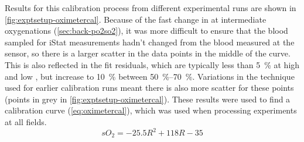 Results for this calibration process from different experimental runs are shown in \autoref{fig:exptsetup-oximetercal}.
Because of the fast change in \SOtwo at intermediate oxygenations (\autoref{sec:back-po2so2}), it was more difficult to ensure that the blood sampled for iStat measurements hadn't changed from the blood measured at the sensor, so there is a larger scatter in the data points in the middle of the curve.
This is also reflected in the fit residuals, which are typically less than \SI{5}{\percent} at high and low \SOtwo, but increase to \SI{10}{\percent} between \SIrange{50}{70}{\percent}.
Variations in the technique used for earlier calibration runs meant there is also more scatter for these points (points in grey in \autoref{fig:exptsetup-oximetercal}).
These results were used to find a calibration curve (\autoref{eq:oximetercal}), which was used when processing experiments at all fields.
\begin{equation}
\mathit{sO_2} = -25.5 R^2 + 118 R - 35
\label{eq:oximetercal}
\end{equation}
